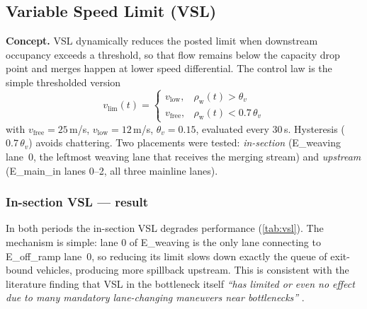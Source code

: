 \documentclass[11pt,a4paper]{article}
\begin{document}
\subsection{Variable Speed Limit (VSL)}
\label{sec:vsl}
\textbf{Concept.} VSL dynamically reduces the posted limit when downstream occupancy exceeds a threshold, so that flow remains below the capacity drop point and merges happen at lower speed differential. The control law is the simple thresholded version
\begin{equation}
v_{\text{lim}}(t) =
\begin{cases}
v_{\text{low}}, & \rho_{\text{w}}(t) > \theta_v \\
v_{\text{free}}, & \rho_{\text{w}}(t) < 0.7\,\theta_v
\end{cases}
\label{eq:vslcontrol}
\end{equation}
with $v_{\text{free}}=25$\,m/s, $v_{\text{low}}=12$\,m/s, $\theta_v=0.15$, evaluated every 30\,s. Hysteresis ($0.7\,\theta_v$) avoids chattering. Two placements were tested: \emph{in-section} (E\_weaving lane~0, the leftmost weaving lane that receives the merging stream) and \emph{upstream} (E\_main\_in lanes 0--2, all three mainline lanes).

\subsubsection{In-section VSL --- result}
In both periods the in-section VSL degrades performance (\cref{tab:vsl}). The mechanism is simple: lane 0 of E\_weaving is the only lane connecting to E\_off\_ramp lane~0, so reducing its limit slows down exactly the queue of exit-bound vehicles, producing more spillback upstream. This is consistent with the literature finding that VSL in the bottleneck itself \emph{``has limited or even no effect due to many mandatory lane-changing maneuvers near bottlenecks''} \cite{vsl:grumert_tapani_2018,vsl:abdelaty_2017}.
\end{document}
